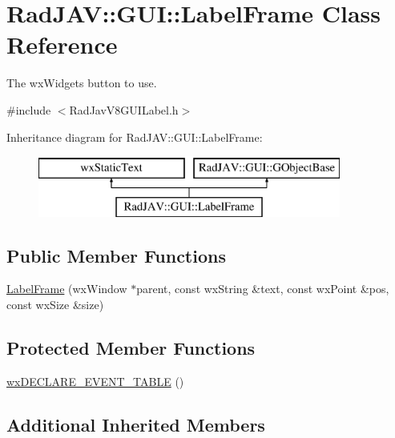 \hypertarget{class_rad_j_a_v_1_1_g_u_i_1_1_label_frame}{}\section{Rad\+J\+AV\+:\+:G\+UI\+:\+:Label\+Frame Class Reference}
\label{class_rad_j_a_v_1_1_g_u_i_1_1_label_frame}


The wx\+Widgets button to use.  




{\ttfamily \#include $<$Rad\+Jav\+V8\+G\+U\+I\+Label.\+h$>$}

Inheritance diagram for Rad\+J\+AV\+:\+:G\+UI\+:\+:Label\+Frame\+:\begin{figure}[H]
\begin{center}
\leavevmode
\includegraphics[height=2.000000cm]{class_rad_j_a_v_1_1_g_u_i_1_1_label_frame}
\end{center}
\end{figure}
\subsection*{Public Member Functions}
\begin{DoxyCompactItemize}
\item 
\mbox{\hyperlink{class_rad_j_a_v_1_1_g_u_i_1_1_label_frame_a2c99bd0a49b3fd60325699c691c20b8f}{Label\+Frame}} (wx\+Window $\ast$parent, const wx\+String \&text, const wx\+Point \&pos, const wx\+Size \&size)
\end{DoxyCompactItemize}
\subsection*{Protected Member Functions}
\begin{DoxyCompactItemize}
\item 
\mbox{\hyperlink{class_rad_j_a_v_1_1_g_u_i_1_1_label_frame_acaa66d308d5f2dffdcdd2a2fbb3a148f}{wx\+D\+E\+C\+L\+A\+R\+E\+\_\+\+E\+V\+E\+N\+T\+\_\+\+T\+A\+B\+LE}} ()
\end{DoxyCompactItemize}
\subsection*{Additional Inherited Members}


